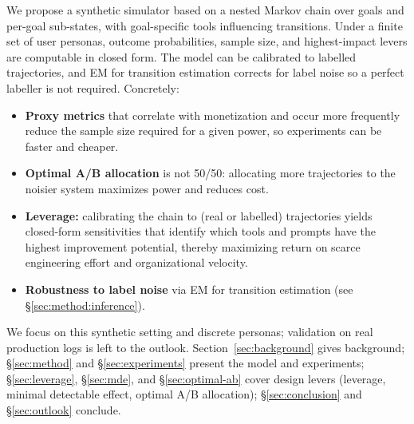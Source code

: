 We propose a synthetic simulator based on a nested Markov chain over goals and per-goal sub-states, with goal-specific tools influencing transitions. Under a finite set of user personas, outcome probabilities, sample size, and highest-impact levers are computable in closed form. The model can be calibrated to labelled trajectories, and EM for transition estimation corrects for label noise so a perfect labeller is not required. Concretely:
\begin{itemize}
  \item \textbf{Proxy metrics} that correlate with monetization and occur more frequently reduce the sample size required for a given power, so experiments can be faster and cheaper.
  \item \textbf{Optimal A/B allocation} is not 50/50: allocating more trajectories to the noisier system maximizes power and reduces cost.
  \item \textbf{Leverage:} calibrating the chain to (real or labelled) trajectories yields closed-form sensitivities that identify which tools and prompts have the highest improvement potential, thereby maximizing return on scarce engineering effort and organizational velocity.
  \item \textbf{Robustness to label noise} via EM for transition estimation (see \S\ref{sec:method:inference}).
\end{itemize}
We focus on this synthetic setting and discrete personas; validation on real production logs is left to the outlook. Section~\ref{sec:background} gives background; \S\ref{sec:method} and \S\ref{sec:experiments} present the model and experiments; \S\ref{sec:leverage}, \S\ref{sec:mde}, and \S\ref{sec:optimal-ab} cover design levers (leverage, minimal detectable effect, optimal A/B allocation); \S\ref{sec:conclusion} and \S\ref{sec:outlook} conclude.

